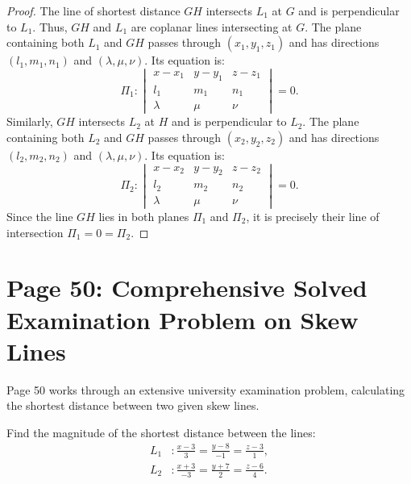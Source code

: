 \begin{proof}
The line of shortest distance $GH$ intersects $L_1$ at $G$ and is perpendicular to $L_1$.
Thus, $GH$ and $L_1$ are coplanar lines intersecting at $G$.
The plane containing both $L_1$ and $GH$ passes through $(x_1, y_1, z_1)$ and has directions $(l_1, m_1, n_1)$ and $(\lambda, \mu, \nu)$. Its equation is:
\begin{equation}
    \Pi_1: \begin{vmatrix}
    x - x_1 & y - y_1 & z - z_1 \\
    l_1 & m_1 & n_1 \\
    \lambda & \mu & \nu
    \end{vmatrix} = 0.
\end{equation}
Similarly, $GH$ intersects $L_2$ at $H$ and is perpendicular to $L_2$.
The plane containing both $L_2$ and $GH$ passes through $(x_2, y_2, z_2)$ and has directions $(l_2, m_2, n_2)$ and $(\lambda, \mu, \nu)$. Its equation is:
\begin{equation}
    \Pi_2: \begin{vmatrix}
    x - x_2 & y - y_2 & z - z_2 \\
    l_2 & m_2 & n_2 \\
    \lambda & \mu & \nu
    \end{vmatrix} = 0.
\end{equation}
Since the line $GH$ lies in both planes $\Pi_1$ and $\Pi_2$, it is precisely their line of intersection $\Pi_1 = 0 = \Pi_2$.
\end{proof}

\section{Page 50: Comprehensive Solved Examination Problem on Skew Lines}
\label{sec:page50}

\begin{conceptbox}
Page 50 works through an extensive university examination problem, calculating the shortest distance between two given skew lines.
\end{conceptbox}

\begin{examplebox}
Find the magnitude of the shortest distance between the lines:
\begin{align}
    L_1 &: \frac{x - 3}{3} = \frac{y - 8}{-1} = \frac{z - 3}{1}, \label{eq:ex_L1} \\
    L_2 &: \frac{x + 3}{-3} = \frac{y + 7}{2} = \frac{z - 6}{4}. \label{eq:ex_L2}
\end{align}
\end{examplebox}

